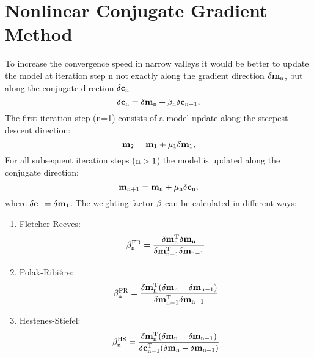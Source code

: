\section{Nonlinear Conjugate Gradient Method}\label{NL_Conjugate_Gradient} 
To increase the convergence speed in narrow valleys it would be better to update the model at iteration step n not exactly along the gradient direction $\rm{\delta \mathbf{m}_n}$, but along the conjugate direction $\rm{\delta \mathbf{c}_n}$
\begin{equation}
\rm{\delta \mathbf{c}_n = \delta \mathbf{m}_n + \beta_n \delta \mathbf{c}_{n-1},}  
\label{conj1}
\end{equation}
The first iteration step (n=1) consists of a model update along the steepest descent direction:
\begin{equation} 
\rm{\mathbf{m}_{2} = \mathbf{m}_{1} + \mu_1 \mathbf{\delta m}_{1}, }
\label{conj1:1}
\end{equation}
For all subsequent iteration steps ($\rm{n>1}$) the model is updated along the conjugate direction:
\begin{equation} 
\rm{\mathbf{m}_{n+1} = \mathbf{m}_{n} + \mu_n \mathbf{\delta c}_{n}, }
\label{conj1:2}
\end{equation}
where $ \rm{\delta \mathbf{c}_{1} = \delta \mathbf{m}_1}$.
The weighting factor $\rm{\beta}$ can be calculated in different ways:
\begin{enumerate}
\item Fletcher-Reeves:\\
\begin{equation}
\rm{\beta^{FR}_n=\frac{\delta \mathbf{m}^T_n \delta \mathbf{m}_n}{\delta \mathbf{m}^T_{n-1} \delta \mathbf{m}_{n-1}}}
\label{conj2}
\end{equation}
\item Polak-Ribi$\rm{\acute{e}}$re:\\
\begin{equation}
\rm{\beta^{PR}_n=\frac{\delta \mathbf{m}^T_n (\delta \mathbf{m}_n - \delta \mathbf{m}_{n-1})}{\delta \mathbf{m}^T_{n-1} \delta \mathbf{m}_{n-1}}}
\label{conj3}
\end{equation}
\item Hestenes-Stiefel:\\
\begin{equation}
\rm{\beta^{HS}_n=\frac{\delta \mathbf{m}^T_n (\delta \mathbf{m}_n - \delta \mathbf{m}_{n-1})}{\delta \mathbf{c}^T_{n-1} (\delta \mathbf{m}_n - \delta \mathbf{m}_{n-1})}}
\end{equation}
\end{enumerate}
